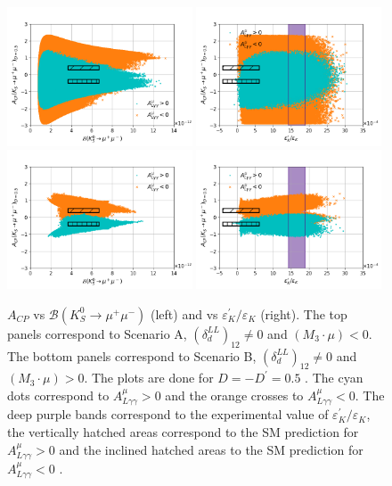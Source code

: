 \begin{figure}
\centering
\includegraphics[width=0.49\textwidth]{figs/Acp_Ksmm_SCA_LL_neg.png}
\includegraphics[width=0.49\textwidth]{figs/Acp_epek_SCA_LL_neg.png}
\includegraphics[width=0.49\textwidth]{figs/Acp_Ksmm_SCB_LL_pos.png}
\includegraphics[width=0.49\textwidth]{figs/Acp_epek_SCB_LL_pos.png}
 	\caption{\label{fig:Acp_SCB}$A_{CP}$ vs $\mathcal{B}(K^0_S \rightarrow \mu^+ \mu^-)$ (left) and vs $\varepsilon^\prime_K/\varepsilon_K$ (right). The top panels correspond to Scenario A, $\left( \delta_d^{LL} \right)_{12} \neq 0$ and $(M_3 \cdot \mu) < 0$. The bottom panels correspond to Scenario B, $\left( \delta^{LL}_d \right)_{12} \neq 0$ and $(M_3 \cdot \mu) > 0$. The plots are done for $D = -D^\prime = 0.5$ . The cyan dots correspond to $A^\mu_{L\gamma \gamma} > 0$ and the orange crosses to $A^\mu_{L\gamma \gamma} < 0$. The deep purple bands correspond to the experimental value of $\varepsilon^\prime_K/\varepsilon_K$, the vertically hatched areas correspond to the SM prediction for $A^\mu_{L\gamma \gamma} > 0$ and the inclined hatched areas to the SM prediction for $A^\mu_{L\gamma \gamma} < 0$ .} 
\end{figure}

